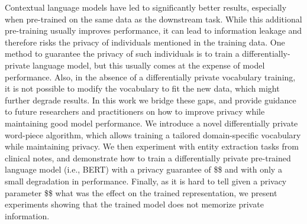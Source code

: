 Contextual language models have led to significantly better results, especially when pre-trained on the same data as the downstream task. While this additional pre-training usually improves performance, it can lead to information leakage and therefore risks the privacy of individuals mentioned in the training data. One method to guarantee the privacy of such individuals is to train a differentially-private language model, but this usually comes at the expense of model performance. Also, in the absence of a differentially private vocabulary training, it is not possible to modify the vocabulary to fit the new data, which might further degrade results. In this work we bridge these gaps, and provide guidance to future researchers and practitioners on how to improve privacy while maintaining good model performance. We introduce a novel differentially private word-piece algorithm, which allows training a tailored domain-specific vocabulary while maintaining privacy. We then experiment with entity extraction tasks from clinical notes, and demonstrate how to train a differentially private pre-trained language model (i.e., BERT) with a privacy guarantee of \$\$ and with only a small degradation in performance. Finally, as it is hard to tell given a privacy parameter \$\epsilon\$ what was the effect on the trained representation, we present experiments showing that the trained model does not memorize private information.
